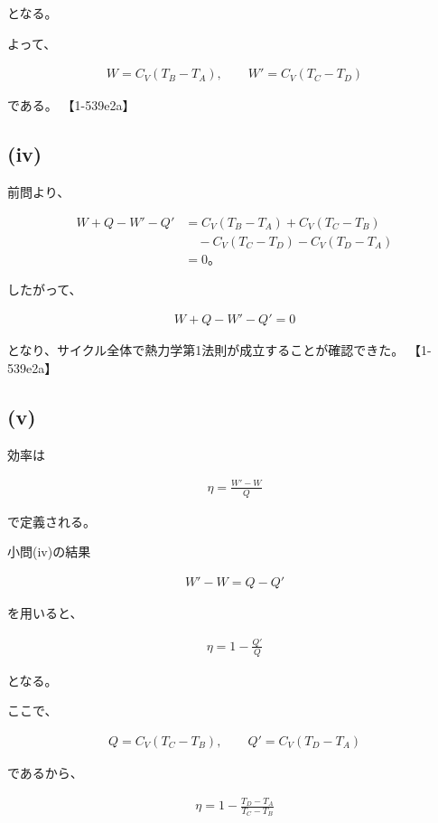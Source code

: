 \documentclass[platex,dvipdfmx,a4paper]{jsarticle}
\begin{document}
となる。

よって、

\begin{align*}
W=C_V(T_B-T_A),
\qquad
W'=C_V(T_C-T_D)
\end{align*}

である。 【1-539e2a】

\subsection{(iv)}

前問より、

\begin{align*}
W+Q-W'-Q'
&=
C_V(T_B-T_A)
+
C_V(T_C-T_B) \\
&\quad
-C_V(T_C-T_D)
-C_V(T_D-T_A) \\
&=
0。
\end{align*}

したがって、

\begin{align*}
W+Q-W'-Q'=0
\end{align*}

となり、サイクル全体で熱力学第1法則が成立することが確認できた。 【1-539e2a】

\subsection{(v)}

効率は

\begin{align*}
\eta
=
\frac{W'-W}{Q}
\end{align*}

で定義される。

小問(iv)の結果

\begin{align*}
W'-W
=
Q-Q'
\end{align*}

を用いると、

\begin{align*}
\eta
=
1-\frac{Q'}{Q}
\end{align*}

となる。

ここで、

\begin{align*}
Q
=
C_V(T_C-T_B),
\qquad
Q'
=
C_V(T_D-T_A)
\end{align*}

であるから、

\begin{align*}
\eta
=
1-
\frac{T_D-T_A}{T_C-T_B}
\end{align*}
\end{document}

